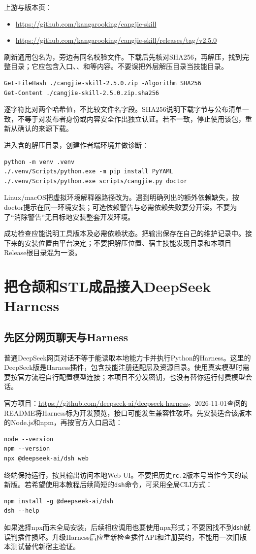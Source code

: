 \documentclass[11pt,a4paper,fontset=fandol]{ctexart}
\begin{document}
\noindent 上游与版本页：
\begin{itemize}
\item \url{https://github.com/kangarooking/cangjie-skill}
\item \url{https://github.com/kangarooking/cangjie-skill/releases/tag/v2.5.0}
\end{itemize}
刷新通用包名为，旁边有同名校验文件。下载后先核对SHA256，再解压，找到完整目录；它应包含入口、、和等内容。不要误把外层解压目录当技能目录。

\begin{lstlisting}
Get-FileHash ./cangjie-skill-2.5.0.zip -Algorithm SHA256
Get-Content ./cangjie-skill-2.5.0.zip.sha256
\end{lstlisting}
逐字符比对两个哈希值，不比较文件名字段。SHA256说明下载字节与公布清单一致，不等于对发布者身份或内容安全作出独立认证。若不一致，停止使用该包，重新从确认的来源下载。

进入含的解压目录，创建作者端环境并做诊断：
\begin{lstlisting}
python -m venv .venv
./.venv/Scripts/python.exe -m pip install PyYAML
./.venv/Scripts/python.exe scripts/cangjie.py doctor
\end{lstlisting}
Linux/macOS把虚拟环境解释器路径改为。遇到明确列出的额外依赖缺失，按doctor提示在同一环境安装；可选依赖警告与必需依赖失败要分开读。不要为了“消除警告”无目标地安装整套开发环境。

成功检查应能说明工具版本及必需依赖状态。把输出保存在自己的维护记录中。接下来的安装位置由平台决定；不要把解压位置、宿主技能发现目录和本项目Release根目录混为一谈。
\section{把仓颉和STL成品接入DeepSeek Harness}
\subsection{先区分网页聊天与Harness}
普通DeepSeek网页对话不等于能读取本地能力卡并执行Python的Harness。这里的DeepSeek版是Harness插件，包含技能注册适配层及资源目录。使用真实模型时需要按官方流程自行配置模型连接；本项目不分发密钥，也没有替你运行付费模型会话。

官方项目：\url{https://github.com/deepseek-ai/deepseek-harness}。2026-11-01查阅的README将Harness标为开发预览，接口可能发生兼容性破坏。先安装适合该版本的Node.js和npm，再按官方入口启动：
\begin{lstlisting}
node --version
npm --version
npx @deepseek-ai/dsh web
\end{lstlisting}
终端保持运行，按其输出访问本地Web UI。不要把历史\texttt{rc.2}版本号当作今天的最新版。若希望使用本教程后续简短的\texttt{dsh}命令，可采用全局CLI方式：
\begin{lstlisting}
npm install -g @deepseek-ai/dsh
dsh --help
\end{lstlisting}
如果选择npx而未全局安装，后续相应调用也要使用npx形式；不要因找不到\texttt{dsh}就误判插件损坏。升级Harness后应重新检查插件API和注册契约，不能用一次旧版本测试替代新宿主验证。
\end{document}
